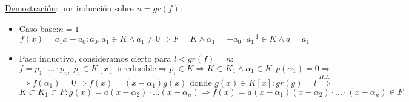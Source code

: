 \documentclass[10pt,a4paper,openright]{book}
\begin{document}
\underline{Demostración}: por inducción sobre $n=gr(f)$:
\begin{itemize}
\item Caso base:$n=1$
$$f(x)=a_1x+a_0: a_0,a_1\in K\wedge a_1\neq 0\Rightarrow F=K\wedge \alpha_1=-a_0\cdot a_1^{-1}\in K\wedge a=a_1$$
\item Paso inductivo, consideramos cierto para $l<gr(f)=n$:
$$f=p_1\cdot ... \cdot p_m: p_i\in K[x] \mbox{ irreducible}\Rightarrow p_i\in K\Rightarrow K\subset K_1 \wedge \alpha_1\in K: p(\alpha_1)=0\Rightarrow$$
$$\Rightarrow f(\alpha_1)=0\Rightarrow f(x)=(x-\alpha_1)g(x)\mbox{ donde }g(x)\in K[x]: gr(g)=l\stackrel{H.I.}{\Rightarrow}$$
$$K\subset K_1\subset F: g(x)=a(x-\alpha_2)\cdot ...(x-\alpha_n)\Rightarrow f(x)=a(x-\alpha_1)(x-\alpha_2)\cdot ... \cdot (x-\alpha_n)\in F$$
\end{itemize}
\end{document}
